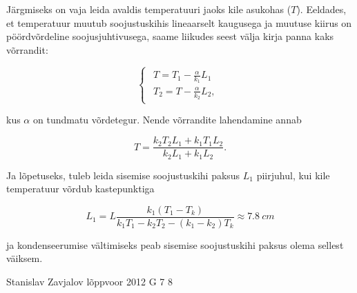 \documentclass[11pt]{article}
\begin{document}
{{Järgmiseks on vaja leida avaldis temperatuuri jaoks kile asukohas
($T$). Eeldades, et temperatuur muutub soojustuskihis lineaarselt
kaugusega ja muutuse kiirus on pöördvõrdeline soojusjuhtivusega, saame
liikudes seest välja kirja panna kaks võrrandit:

\begin{equation*}
\begin{cases}
\begin{array}{c}
T=T_{1}-\frac{\alpha}{k_{1}}L_{1}\\
T_{2}=T-\frac{\alpha}{k_{2}}L_{2},
\end{array}
\end{cases}
\end{equation*}

\noindent kus $\alpha$ on tundmatu võrdetegur. Nende võrrandite lahendamine
annab

\begin{equation*}
T=\frac{k_{2}T_{2}L_{1}+k_{1}T_{1}L_{2}}{k_{2}L_{1}+k_{1}L_{2}}.
\end{equation*}

Ja lõpetuseks, tuleb leida sisemise soojustuskihi paksus $L_{1}$
piirjuhul, kui kile temperatuur võrdub kastepunktiga

\begin{equation*}
L_{1}=L\frac{k_{1}\left(T_{1}-T_{k}\right)}{k_{1}T_{1}-k_{2}T_{2}-\left(k_{1}-k_{2}\right)T_{k}}\approx\SI{7.8}{cm}
\end{equation*}

\noindent ja kondenseerumise vältimiseks peab sisemise soojustuskihi
paksus olema sellest väiksem.
\fi
}

{Stanislav Zavjalov} %
{lõppvoor} %
{2012} %
{G 7} %
{8} %
{

}}
\end{document}
